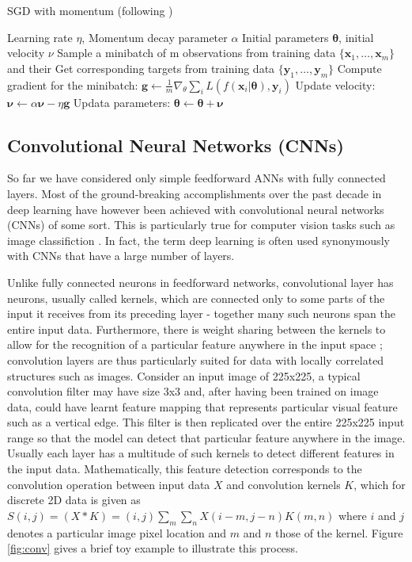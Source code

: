 \documentclass[12pt]{report}
\begin{document}
\begin{algorithm}
  \caption{SGD with momentum (following \cite{Goodfellow2016})} \label{alg:sgd_mom}
\begin{algorithmic}
  \Require Learning rate $\eta$, Momentum decay parameter $\alpha$
  \Require Initial parameters $\pmb{\theta}$, initial velocity $\nu$
  \State Sample a minibatch of m observations from training data $\{\mathbf{x}_1, \dots, \mathbf{x}_m \}$ and their
  \State Get corresponding targets from training data $\{\mathbf{y}_1, \dots, \mathbf{y}_m \}$ 
  \State Compute gradient for the minibatch: $\mathbf{g} \leftarrow \frac{1}{m} \nabla_{\theta}\sum_i L(f(\mathbf{x}_i| \pmb{\theta}), \mathbf{y}_i)$
  \State Update velocity: $\pmb{\nu} \leftarrow \alpha \pmb{\nu} - \eta\mathbf{g}$
  \State Updata parameters: $\pmb{\theta} \leftarrow \pmb{\theta} + \pmb{\nu}$
  \EndWhile
\end{algorithmic}
\end{algorithm}

\subsection{Convolutional Neural Networks (CNNs)}

So far we have considered only simple feedforward ANNs with fully connected layers. Most of the ground-breaking accomplishments over the past decade in deep learning have however been achieved with convolutional neural networks (CNNs) \cite{Le} of some sort. This is particularly true for computer vision tasks such as image classifiction \cite{JurgenSchmidhuber2015}. In fact, the term deep learning is often used synonymously with CNNs that have a large number of layers.

Unlike fully connected neurons in feedforward networks, convolutional layer has neurons, usually called kernels, which are connected only to some parts of the input it receives from its preceding layer - together many such neurons span the entire input data. Furthermore, there is weight sharing between the kernels to allow for the recognition of a particular feature anywhere in the input space \cite{Lecun2015}; convolution layers are thus particularly suited for data with locally correlated structures such as images. Consider an input image of 225x225, a typical convolution filter may have size 3x3 and, after having been trained on image data, could have learnt feature mapping that represents particular visual feature such as a vertical edge. This filter is then replicated over the entire 225x225 input range so that the model can detect that particular feature anywhere in the image. Usually each layer has a multitude of such kernels to detect different features in the input data. Mathematically, this feature detection corresponds to the convolution operation between input data $X$ and convolution kernels $K$, which for discrete 2D data is given as $S(i, j) = (X \ast K)=(i, j) \sum_m \sum_n X(i-m, j-n)K(m, n)$ \cite{Goodfellow2016} where $i$ and $j$ denotes a particular image pixel location and $m$ and $n$ those of the kernel. Figure \ref{fig:conv} gives a brief toy example to illustrate this process. 
  
\end{document}

